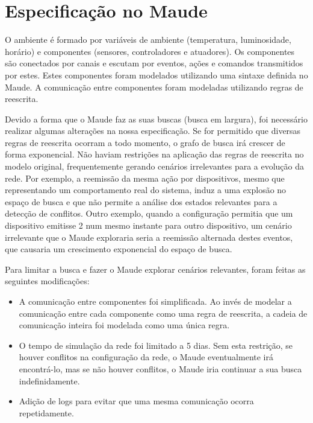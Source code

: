 \section{Especificação no Maude} \label{sec:chap5}

O ambiente é formado por variáveis de ambiente (temperatura, luminosidade, horário) e componentes (sensores, controladores e atuadores). Os componentes são conectados por canais e escutam por eventos, ações e comandos transmitidos por estes. Estes componentes foram modelados utilizando uma sintaxe definida no Maude. A comunicação entre componentes foram modeladas utilizando regras de reescrita.

Devido a forma que o Maude faz as suas buscas (busca em largura), foi necessário realizar algumas alterações na nossa especificação. Se for permitido que diversas regras de reescrita ocorram a todo momento, o grafo de busca irá crescer de forma exponencial.
Não haviam restrições na aplicação das regras de reescrita no modelo original, frequentemente gerando cenários irrelevantes para a evolução da rede. Por exemplo, a reemissão da mesma ação por dispositivos, mesmo que representando um comportamento real do sistema, induz a uma explosão no espaço de busca e que não permite a análise dos estados relevantes para a detecção de conflitos.
Outro exemplo, quando a configuração permitia que um dispositivo emitisse 2  num mesmo instante para outro dispositivo, um cenário irrelevante que o Maude exploraria seria a reemissão alternada destes eventos, que causaria um crescimento exponencial do espaço de busca.

Para limitar a busca e fazer o Maude explorar cenários relevantes, foram feitas as seguintes modificações:

\begin{itemize}
  \item A comunicação entre componentes foi simplificada. Ao invés de modelar a comunicação entre cada componente como uma regra de reescrita, a cadeia de comunicação inteira foi modelada como uma única regra.
  \item O tempo de simulação da rede foi limitado a 5 dias. Sem esta restrição, se houver conflitos na configuração da rede, o Maude eventualmente irá encontrá-lo, mas se não houver conflitos, o Maude iria continuar a sua busca indefinidamente.
  \item Adição de logs para evitar que uma mesma comunicação ocorra repetidamente.
\end{itemize}

